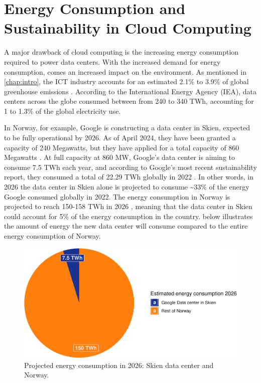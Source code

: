 \documentclass[
  table]{report}
\begin{document}
\section{Energy Consumption and Sustainability in Cloud Computing}

A major drawback of cloud computing is the increasing energy consumption
required to power data centers. With the increased demand for energy
consumption, comes an increased impact on the environment. As mentioned
in \cref{chap:intro}, the ICT industry accounts for an estimated 2.1\%
to 3.9\% of global greenhouse emissions \citep{freitag2021}. According
to the International Energy Agency (IEA), data centers across the globe
consumed between from 240 to 340 TWh, accounting for 1 to 1.3\% of the
global electricity use.

In Norway, for example, Google is constructing a data center in Skien,
expected to be fully operational by 2026. As of April 2024, they have
been granted a capacity of 240 Megawatts, but they have applied for a
total capacity of 860 Megawatts
\citep{rivrudInvesteringenAvGooglesenter2024}. At full capacity at 860
MW, Google's data center is aiming to consume 7.5 TWh each year, and
according to Google's most recent sustainability report, they consumed a
total of 22.29 TWh globally in 2022 \citep{Google2023Environmental2023}.
In other words, in 2026 the data center in Skien alone is projected to
consume \textasciitilde33\% of the energy Google consumed globally in
2022. The energy consumption in Norway is projected to reach 150-158 TWh
in 2026 \citep{gunnerodStatnettAnalyse2022}, meaning that the data
center in Skien could account for 5\% of the energy consumption in the
country.  below illustrates the amount of energy
the new data center will consume compared to the entire energy
consumption of Norway.

\vspace{0.25cm}

\begin{figure}[H]

{\centering \includegraphics[width=0.8\linewidth]{thesis_files/figure-latex/skienvsnorway-1} 

}

\caption{Projected energy consumption in 2026: Skien data center and Norway.}\label{fig:skienvsnorway}
\end{figure}
\end{document}

